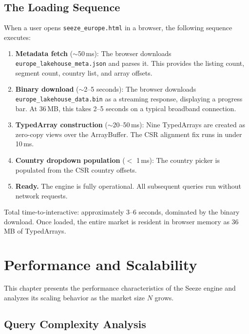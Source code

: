 \documentclass[11pt,a4paper,twoside]{book}
\begin{document}
\section{The Loading Sequence}

When a user opens \texttt{seeze\_europe.html} in a browser, the following sequence executes:

\begin{enumerate}[leftmargin=*]
    \item \textbf{Metadata fetch} ($\sim$50\,ms): The browser downloads
          \texttt{europe\_lakehouse\_meta.json} and parses it. This provides the listing
          count, segment count, country list, and array offsets.
    \item \textbf{Binary download} ($\sim$2--5 seconds): The browser downloads
          \texttt{europe\_lakehouse\_data.bin} as a streaming response, displaying a progress
          bar. At 36\,MB, this takes 2--5 seconds on a typical broadband connection.
    \item \textbf{TypedArray construction} ($\sim$20--50\,ms): Nine TypedArrays are created as
          zero-copy views over the ArrayBuffer. The CSR alignment fix runs in under 10\,ms.
    \item \textbf{Country dropdown population} ($<$ 1\,ms): The country picker is populated
          from the CSR country offsets.
    \item \textbf{Ready.} The engine is fully operational. All subsequent queries run without
          network requests.
\end{enumerate}

Total time-to-interactive: approximately 3--6 seconds, dominated by the binary download.
Once loaded, the entire market is resident in browser memory as 36\,MB of TypedArrays.

\chapter{Performance and Scalability}

This chapter presents the performance characteristics of the Seeze engine and analyzes its
scaling behavior as the market size $N$ grows.

\section{Query Complexity Analysis}
\end{document}
